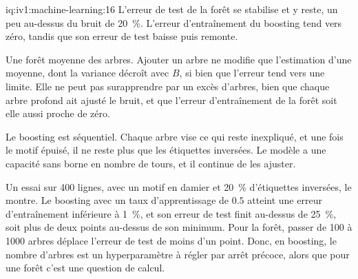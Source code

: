 \begin{solution}{iq:iv1:machine-learning:16}
L'erreur de test de la forêt se stabilise et y reste, un peu au-dessus du bruit de 20~\%. L'erreur d'entraînement du boosting tend vers zéro, tandis que son erreur de test baisse puis remonte.

Une forêt moyenne des arbres. Ajouter un arbre ne modifie que l'estimation d'une moyenne, dont la variance décroît avec $B$, si bien que l'erreur tend vers une limite. Elle ne peut pas surapprendre par un excès d'arbres, bien que chaque arbre profond ait ajusté le bruit, et que l'erreur d'entraînement de la forêt soit elle aussi proche de zéro.

Le boosting est séquentiel. Chaque arbre vise ce qui reste inexpliqué, et une fois le motif épuisé, il ne reste plus que les étiquettes inversées. Le modèle a une capacité sans borne en nombre de tours, et il continue de les ajuster.

Un essai sur 400 lignes, avec un motif en damier et 20~\% d'étiquettes inversées, le montre. Le boosting avec un taux d'apprentissage de $0.5$ atteint une erreur d'entraînement inférieure à 1~\%, et son erreur de test finit au-dessus de 25~\%, soit plus de deux points au-dessus de son minimum. Pour la forêt, passer de 100 à 1000 arbres déplace l'erreur de test de moins d'un point. Donc, en boosting, le nombre d'arbres est un hyperparamètre à régler par arrêt précoce, alors que pour une forêt c'est une question de calcul.



\end{solution}

